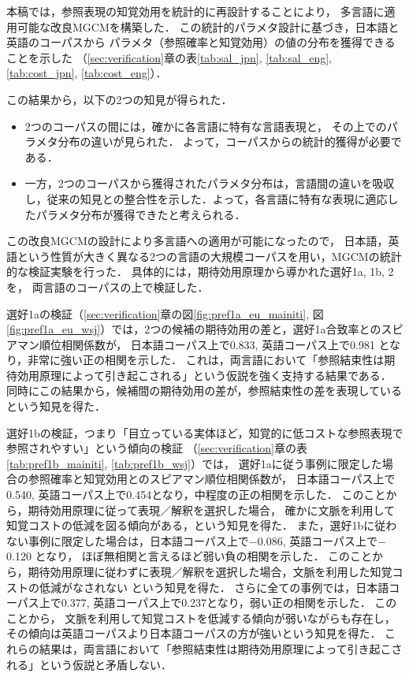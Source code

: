 \documentclass[japanese]{jnlp_1.3e}
\begin{document}
本稿では，参照表現の知覚効用を統計的に再設計することにより，
多言語に適用可能な改良MGCMを構築した．
この統計的パラメタ設計に基づき，日本語と英語のコーパスから
パラメタ（参照確率と知覚効用）の値の分布を獲得できることを示した
（\ref{sec:verification}章の表\ref{tab:sal_jpn}, \ref{tab:sal_eng}, \ref{tab:cost_jpn}, \ref{tab:cost_eng}）．

この結果から，以下の2つの知見が得られた．
\begin{itemize}
\item 2つのコーパスの間には，確かに各言語に特有な言語表現と，
その上でのパラメタ分布の違いが見られた．
よって，コーパスからの統計的獲得が必要である．
\item 一方，2つのコーパスから獲得されたパラメタ分布は，言語間の違いを吸収し，従来の知見との整合性を示した．よって，各言語に特有な表現に適応したパラメタ分布が獲得できたと考えられる．
\end{itemize}

この改良MGCMの設計により多言語への適用が可能になったので，
日本語，英語という性質が大きく異なる2つの言語の大規模コーパスを用い，MGCMの統計的な検証実験を行った．
具体的には，期待効用原理から導かれた選好1a, 1b, 2 を，
両言語のコーパスの上で検証した．

選好1aの検証（\ref{sec:verification}章の図\ref{fig:pref1a_eu_mainiti}, 図\ref{fig:pref1a_eu_wsj}）では，2つの候補の期待効用の差と，選好1a合致率とのスピアマン順位相関係数が，
日本語コーパス上で0.833, 英語コーパス上で0.981 となり，非常に強い正の相関を示した．
これは，両言語において「参照結束性は期待効用原理によって引き起こされる」という仮説を強く支持する結果である．
同時にこの結果から，候補間の期待効用の差が，参照結束性の差を表現しているという知見を得た．

選好1bの検証，つまり「目立っている実体ほど，知覚的に低コストな参照表現で参照されやすい」という傾向の検証 （\ref{sec:verification}章の表\ref{tab:pref1b_mainiti}, \ref{tab:pref1b_wsj}）では，
選好1aに従う事例に限定した場合の参照確率と知覚効用とのスピアマン順位相関係数が，
日本語コーパス上で0.540, 英語コーパス上で0.454となり，中程度の正の相関を示した．
このことから，期待効用原理に従って表現／解釈を選択した場合，
確かに文脈を利用して知覚コストの低減を図る傾向がある，という知見を得た．
また，選好1bに従わない事例に限定した場合は，日本語コーパス上で$-$0.086, 英語コーパス上で$-$0.120 となり，
ほぼ無相関と言えるほど弱い負の相関を示した．
このことから，期待効用原理に従わずに表現／解釈を選択した場合，文脈を利用した知覚コストの低減がなされない
という知見を得た．
さらに全ての事例では，日本語コーパス上で0.377, 英語コーパス上で0.237となり，弱い正の相関を示した．
このことから，
文脈を利用して知覚コストを低減する傾向が弱いながらも存在し，
その傾向は英語コーパスより日本語コーパスの方が強いという知見を得た．
これらの結果は，両言語において「参照結束性は期待効用原理によって引き起こされる」という仮説と矛盾しない．
\end{document}
